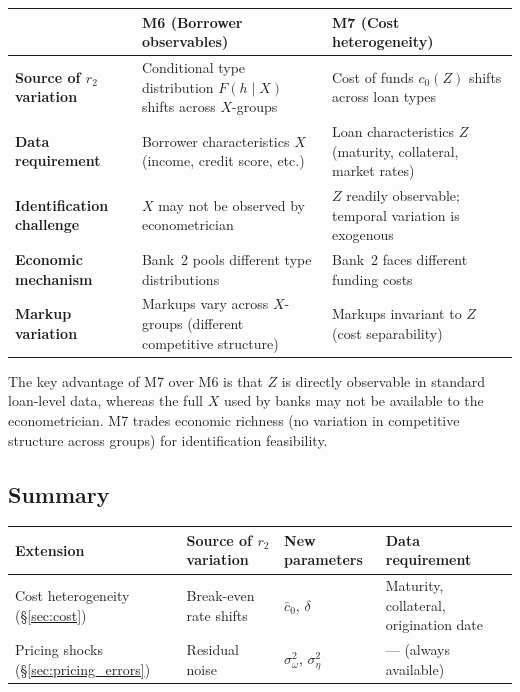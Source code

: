 \documentclass[12pt]{article}
\theoremstyle{plain}
\theoremstyle{plain}
\theoremstyle{definition}  %
\theoremstyle{remark}  %
\begin{document}
\begin{center}
\renewcommand{\arraystretch}{1.4}
\begin{tabular}{p{3.5cm}p{5cm}p{5cm}}
\toprule
& \textbf{M6 (Borrower observables)} & \textbf{M7 (Cost heterogeneity)} \\
\midrule
\textbf{Source of $r_2$ variation} & Conditional type distribution $F(h \mid X)$ shifts across $X$-groups & Cost of funds $c_0(Z)$ shifts across loan types \\
\textbf{Data requirement} & Borrower characteristics $X$ (income, credit score, etc.) & Loan characteristics $Z$ (maturity, collateral, market rates) \\
\textbf{Identification challenge} & $X$ may not be observed by econometrician & $Z$ readily observable; temporal variation is exogenous \\
\textbf{Economic mechanism} & Bank~2 pools different type distributions & Bank~2 faces different funding costs \\
\textbf{Markup variation} & Markups vary across $X$-groups (different competitive structure) & Markups invariant to $Z$ (cost separability) \\
\bottomrule
\end{tabular}
\end{center}

The key advantage of M7 over M6 is that $Z$ is directly observable in standard loan-level data, whereas the full $X$ used by banks may not be available to the econometrician. M7 trades economic richness (no variation in competitive structure across groups) for identification feasibility.

\subsection{Summary}

\begin{center}
\renewcommand{\arraystretch}{1.4}
\begin{tabular}{p{3.8cm}p{3.5cm}p{3cm}p{3cm}}
\toprule
\textbf{Extension} & \textbf{Source of $r_2$ variation} & \textbf{New parameters} & \textbf{Data requirement} \\
\midrule
Cost heterogeneity (\S\ref{sec:cost}) & Break-even rate shifts & $\bar{c}_0$, $\delta$ & Maturity, collateral, origination date \\
Pricing shocks (\S\ref{sec:pricing_errors}) & Residual noise & $\sigma_\omega^2$, $\sigma_\eta^2$ & --- (always available) \\
\bottomrule
\end{tabular}
\end{center}
\end{document}
